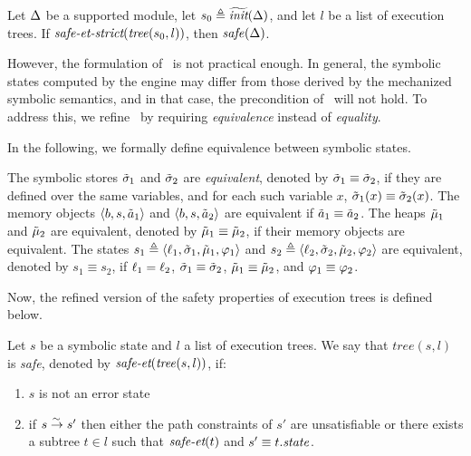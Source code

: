 {\begin{lemma}
\label{lemma:safety-via-et-strict}
Let $\module$ be a supported module, let $s_0 \triangleq \initsymstate(\module)$, and let $l$ be a list of execution trees.
If $\safeetstrict(\tree(s_0, l))$, then $\issafe(\module)$.
\end{lemma}

However, the formulation of~ is not practical enough.
In general, the symbolic states computed by the \SE engine may differ from those derived by the mechanized symbolic semantics,
and in that case, the precondition of~ will not hold.
To address this,
we refine~ by requiring \emph{equivalence} instead of \emph{equality}.

In the following, we formally define equivalence between symbolic states.

\begin{definition}
The symbolic stores $\symlocalstore_1$ and $\symlocalstore_2$ are \emph{equivalent}, denoted by $\symlocalstore_1\equiv \symlocalstore_2$, if they are defined over the same variables,
and for each such variable $x$, $\mapaccess{\symlocalstore_1}{x} \equiv \mapaccess{\symlocalstore_2}{x}$.
The memory objects $\mobj{\addr}{\size}{\smtarray_1}$ and $\mobj{\addr}{\size}{\smtarray_2}$ are equivalent if $\smtarray_1 \equiv \smtarray_2$.
The heaps $\symmemory_1$ and $\symmemory_2$ are equivalent, denoted by $\symmemory_1 \equiv \symmemory_2$,
if their memory objects are equivalent.
The states $s_1 \triangleq \symstate{\location_1}{\symlocalstore_1}{\symstack_1}{\symmemory_1}{\pc_1}$ and $s_2 \triangleq \symstate{\location_2}{\symlocalstore_2}{\symstack_2}{\symmemory_2}{\pc_2}$ are equivalent,
denoted by $s_1 \equiv s_2$, if $\location_1 = \location_2$, $\symlocalstore_1 \equiv \symlocalstore_2$, $\symmemory_1 \equiv \symmemory_2$, and $\pc_1 \equiv \pc_2$.
\end{definition}

Now, the refined version of the safety properties of execution trees is defined below.

\begin{definition}
\label{def:safe-et}
Let $s$ be a symbolic state and $l$ a list of execution trees.
We say that $tree(s, l)$ is \emph{safe}, denoted by $\safeet(\tree(s, l))$, if:
\begin{enumerate}
    \item $s$ is not an error state
    \item if $s \symstep s'$ then either the path constraints of $s'$ are unsatisfiable or there exists a subtree $t \in l$ such that $\safeet(t)$ and $s' \equivstate t.\attrstate$.
\end{enumerate}
\end{definition}

}

